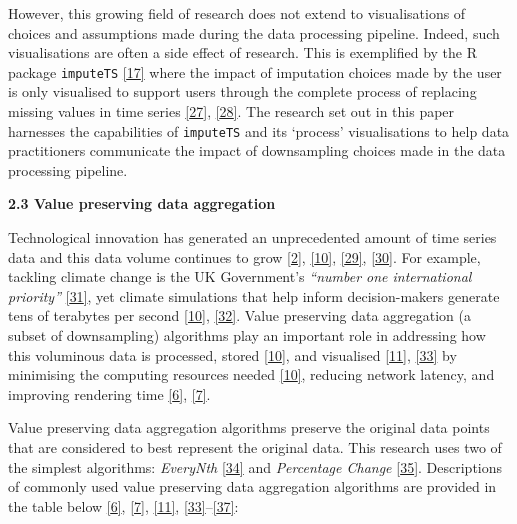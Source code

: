 \documentclass{article}
\begin{document}
However, this growing field of research does not extend to
visualisations of choices and assumptions made during the data
processing pipeline. Indeed, such visualisations are often a side effect
of research. This is exemplified by the R package \texttt{imputeTS}
\protect\hyperlink{ref-imputeTS_R}{{[}17{]}} where the impact of
imputation choices made by the user is only visualised to support users
through the complete process of replacing missing values in time series
\protect\hyperlink{ref-imputeTS}{{[}27{]}},
\protect\hyperlink{ref-missingdata}{{[}28{]}}. The research set out in
this paper harnesses the capabilities of \texttt{imputeTS} and its
`process' visualisations to help data practitioners communicate the
impact of downsampling choices made in the data processing pipeline.

\textbf{2.3 Value preserving data aggregation}

Technological innovation has generated an unprecedented amount of time
series data and this data volume continues to grow
\protect\hyperlink{ref-data2020}{{[}2{]}},
\protect\hyperlink{ref-TVStore}{{[}10{]}},
\protect\hyperlink{ref-storage}{{[}29{]}},
\protect\hyperlink{ref-CatchUp}{{[}30{]}}. For example, tackling climate
change is the UK Government's \emph{``number one international
priority''} \protect\hyperlink{ref-IR}{{[}31{]}}, yet climate
simulations that help inform decision-makers generate tens of terabytes
per second \protect\hyperlink{ref-TVStore}{{[}10{]}},
\protect\hyperlink{ref-climate}{{[}32{]}}. Value preserving data
aggregation (a subset of downsampling) algorithms play an important role
in addressing how this voluminous data is processed, stored
\protect\hyperlink{ref-TVStore}{{[}10{]}}, and visualised
\protect\hyperlink{ref-Sveinn}{{[}11{]}},
\protect\hyperlink{ref-dashql}{{[}33{]}} by minimising the computing
resources needed \protect\hyperlink{ref-TVStore}{{[}10{]}}, reducing
network latency, and improving rendering time
\protect\hyperlink{ref-datapoint}{{[}6{]}},
\protect\hyperlink{ref-MinMaxLTTB}{{[}7{]}}.

Value preserving data aggregation algorithms preserve the original data
points that are considered to best represent the original data. This
research uses two of the simplest algorithms: \emph{EveryNth}
\protect\hyperlink{ref-EveryNth}{{[}34{]}} and \emph{Percentage Change}
\protect\hyperlink{ref-boxcar}{{[}35{]}}. Descriptions of commonly used
value preserving data aggregation algorithms are provided in the table
below \protect\hyperlink{ref-datapoint}{{[}6{]}},
\protect\hyperlink{ref-MinMaxLTTB}{{[}7{]}},
\protect\hyperlink{ref-Sveinn}{{[}11{]}},
\protect\hyperlink{ref-dashql}{{[}33{]}}--\protect\hyperlink{ref-M4}{{[}37{]}}:
\end{document}
